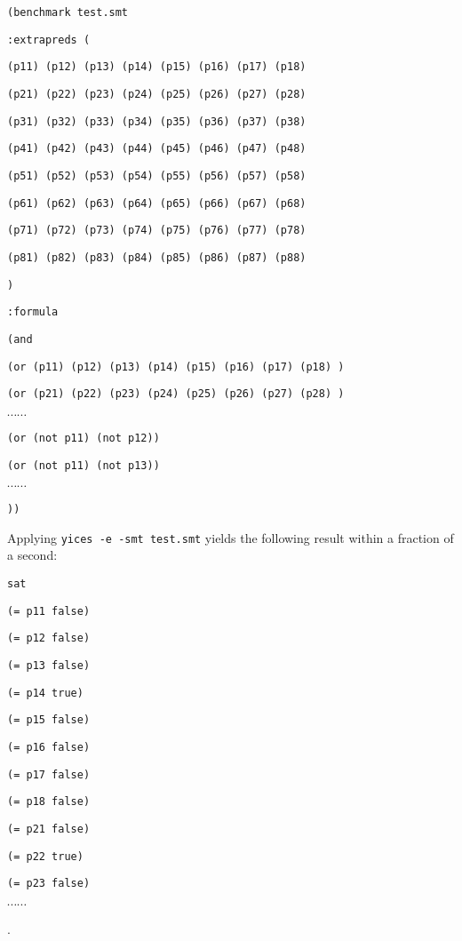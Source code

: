 \documentclass[12pt]{article}
\begin{document}
{\footnotesize

{\tt (benchmark test.smt}

{\tt :extrapreds (}

{\tt (p11) (p12) (p13) (p14) (p15) (p16) (p17) (p18) }

{\tt (p21) (p22) (p23) (p24) (p25) (p26) (p27) (p28) }

{\tt (p31) (p32) (p33) (p34) (p35) (p36) (p37) (p38) }

{\tt (p41) (p42) (p43) (p44) (p45) (p46) (p47) (p48) }

{\tt (p51) (p52) (p53) (p54) (p55) (p56) (p57) (p58) }

{\tt (p61) (p62) (p63) (p64) (p65) (p66) (p67) (p68) }

{\tt (p71) (p72) (p73) (p74) (p75) (p76) (p77) (p78) }

{\tt (p81) (p82) (p83) (p84) (p85) (p86) (p87) (p88) }

{\tt )}

{\tt :formula}

{\tt   (and}

{\tt (or (p11) (p12) (p13) (p14) (p15) (p16) (p17) (p18) )}

{\tt (or (p21) (p22) (p23) (p24) (p25) (p26) (p27) (p28) )}

$\cdots \cdots$

{\tt (or (not p11) (not p12)) }

{\tt (or (not p11) (not p13)) }

$\cdots \cdots$

{\tt )) }
}

Applying {\tt yices -e -smt test.smt} yields the following result
within a fraction of a second:

{\footnotesize

{\tt sat }

{\tt (= p11 false)}

{\tt (= p12 false)}

{\tt (= p13 false)}

{\tt (= p14 true)}

{\tt (= p15 false)}

{\tt (= p16 false)}

{\tt (= p17 false)}

{\tt (= p18 false)}

{\tt (= p21 false)}

{\tt (= p22 true)}

{\tt (= p23 false)}

$\cdots \cdots$ }.
\end{document}
